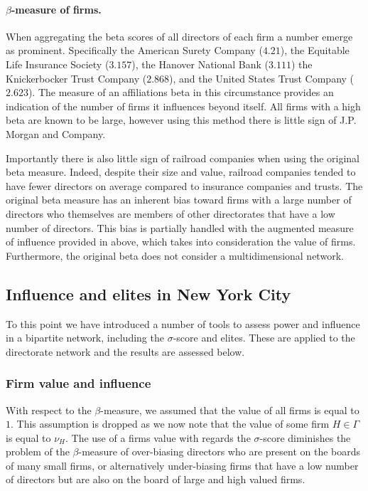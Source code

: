 \documentclass[11pt,fleqn]{article}
\begin{document}
\paragraph{$\beta$-measure of firms.}

When aggregating the beta scores of all directors of each firm a number emerge as prominent. Specifically the American Surety Company ($4.21$), the Equitable Life Insurance Society ($3.157$), the Hanover National Bank ($3.111$) the Knickerbocker Trust Company ($2.868$), and the United States Trust Company ($2.623$). The measure of an affiliations beta in this circumstance provides an indication of the number of firms it influences beyond itself. All firms with a high beta are known to be large, however using this method there is little sign of J.P. Morgan and Company.

Importantly there is also little sign of railroad companies when using the original beta measure. Indeed, despite their size and value, railroad companies tended to have fewer directors on average compared to insurance companies and trusts. The original beta measure has an inherent bias toward firms with a large number of directors who themselves are members of other directorates that have a low number of directors. This bias is partially handled with the augmented measure of influence provided in above, which takes into consideration the value of firms. Furthermore, the original beta does not consider a multidimensional network.

\subsection{Influence and elites in New York City}

To this point we have introduced a number of tools to assess power and influence in a bipartite network, including the $\sigma$-score and elites. These are applied to the directorate network and the results are assessed below.

\subsubsection*{Firm value and influence}

With respect to the $\beta$-measure, we assumed that the value of all firms is equal to $1$. This assumption is dropped as we now note that the value of some firm $H \in \Gamma$ is equal to $\nu_{H}$. The use of a firms value with regards the $\sigma$-score diminishes the problem of the $\beta$-measure of over-biasing directors who are present on the boards of many small firms, or alternatively under-biasing firms that have a low number of directors but are also on the board of large and high valued firms.
\end{document}
